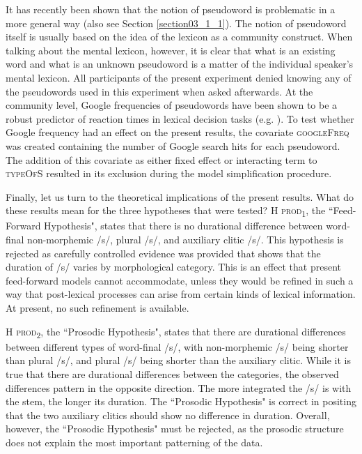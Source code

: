 It has recently been shown that the notion of pseudoword is problematic in a more general way (also see Section \ref{section03_1_1}). The notion of pseudoword itself is usually based on the idea of the lexicon as a community construct. When talking about the mental lexicon, however, it is clear that what is an existing word and what is an unknown pseudoword is a matter of the individual speaker’s mental lexicon. All participants of the present experiment denied knowing any of the pseudowords used in this experiment when asked afterwards. At the community level, Google frequencies of pseudowords have been shown to be a robust predictor of reaction times in lexical decision tasks (e.g. \cite{Hendrix2020}). To test whether Google frequency had an effect on the present results, the covariate \textsc{googleFreq} was created containing the number of Google search hits for each pseudoword. The addition of this covariate as either fixed effect or interacting term to \textsc{typeOfS} resulted in its exclusion during the model simplification procedure.

Finally, let us turn to the theoretical implications of the present results. What do these results mean for the three hypotheses that were tested? \textsc{H prod\textsubscript{1}}, the ``Feed-Forward Hypothesis", states that there is no durational difference between word-final non-morphemic /s/, plural /s/, and auxiliary clitic /s/. This hypothesis is rejected as carefully controlled evidence was provided that shows that the duration of /s/ varies by morphological category. This is an effect that present feed-forward models cannot accommodate, unless they would be refined in such a way that post-lexical processes can arise from certain kinds of lexical information. At present, no such refinement is available. 

\textsc{H prod\textsubscript{2}}, the ``Prosodic Hypothesis", states that there are durational differences between different types of word-final /s/, with non-morphemic /s/ being shorter than plural /s/, and plural /s/ being shorter than the auxiliary clitic. While it is true that there are durational differences between the categories, the observed differences pattern in the opposite direction. The more integrated the /s/ is with the stem, the longer its duration. The ``Prosodic Hypothesis" is correct in positing that the two auxiliary clitics should show no difference in duration. Overall, however, the ``Prosodic Hypothesis" must be rejected, as the prosodic structure does not explain the most important patterning of the data.

